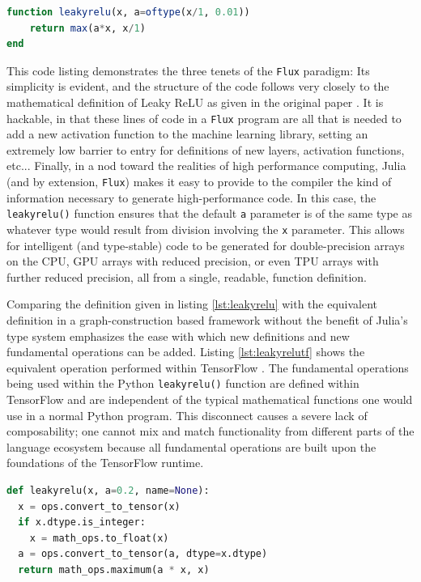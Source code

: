 \documentclass{juliacon}
\begin{document}
\begin{lstlisting}[language = Julia,
                  label={lst:leakyrelu},
                  caption={\texttt{leakyrelu()} activation function definition},
                  captionpos=b]
function leakyrelu(x, a=oftype(x/1, 0.01))
    return max(a*x, x/1)
end
\end{lstlisting}
This code listing demonstrates the three tenets of the \texttt{Flux} paradigm: Its simplicity is evident, and the structure of the code follows very closely to the mathematical definition of Leaky ReLU as given in the original paper \cite{maas_leakyrelu_2013}.  It is hackable, in that these lines of code in a \texttt{Flux} program are all that is needed to add a new activation function to the machine learning library, setting an extremely low barrier to entry for definitions of new layers, activation functions, etc...  Finally, in a nod toward the realities of high performance computing, Julia (and by extension, \texttt{Flux}) makes it easy to provide to the compiler the kind of information necessary to generate high-performance code.  In this case, the \texttt{leakyrelu()} function ensures that the default \texttt{a} parameter is of the same type as whatever type would result from division involving the \texttt{x} parameter.  This allows for intelligent (and type-stable) code to be generated for double-precision arrays on the CPU, GPU arrays with reduced precision, or even TPU arrays with further reduced precision, all from a single, readable, function definition.

Comparing the definition given in listing \ref{lst:leakyrelu} with the equivalent definition in a graph-construction based framework without the benefit of Julia's type system emphasizes the ease with which new definitions and new fundamental operations can be added.  Listing \ref{lst:leakyrelutf} shows the equivalent operation performed within TensorFlow \cite{abadi2016tensorflow}.  The fundamental operations being used within the Python \texttt{leakyrelu()} function are defined within TensorFlow and are independent of the typical mathematical functions one would use in a normal Python program.  This disconnect causes a severe lack of composability; one cannot mix and match functionality from different parts of the language ecosystem because all fundamental operations are built upon the foundations of the TensorFlow runtime.

\begin{lstlisting}[language = Python,
                  label={lst:leakyrelutf},
                  caption={\texttt{leakyrelu()} activation function definition},
                  captionpos=b]
def leakyrelu(x, a=0.2, name=None):
  x = ops.convert_to_tensor(x)
  if x.dtype.is_integer:
    x = math_ops.to_float(x)
  a = ops.convert_to_tensor(a, dtype=x.dtype)
  return math_ops.maximum(a * x, x)
\end{lstlisting}
\end{document}
